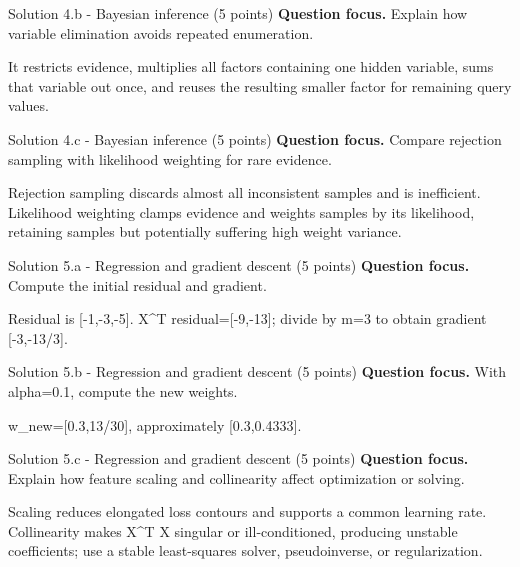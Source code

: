 \documentclass[aspectratio=169,11pt]{beamer}
\begin{document}
\begin{frame}{Solution 4.b - Bayesian inference (5 points)}
\small
\textbf{Question focus.} Explain how variable elimination avoids repeated enumeration.

\vspace{0.25cm}
\answerlabel It restricts evidence, multiplies all factors containing one hidden variable, sums that variable out once, and reuses the resulting smaller factor for remaining query values.
\end{frame}

\begin{frame}{Solution 4.c - Bayesian inference (5 points)}
\small
\textbf{Question focus.} Compare rejection sampling with likelihood weighting for rare evidence.

\vspace{0.25cm}
\answerlabel Rejection sampling discards almost all inconsistent samples and is inefficient. Likelihood weighting clamps evidence and weights samples by its likelihood, retaining samples but potentially suffering high weight variance.
\end{frame}

\begin{frame}{Solution 5.a - Regression and gradient descent (5 points)}
\small
\textbf{Question focus.} Compute the initial residual and gradient.

\vspace{0.25cm}
\answerlabel Residual is [-1,-3,-5]. X\textasciicircum{}T residual=[-9,-13]; divide by m=3 to obtain gradient [-3,-13/3].
\end{frame}

\begin{frame}{Solution 5.b - Regression and gradient descent (5 points)}
\small
\textbf{Question focus.} With alpha=0.1, compute the new weights.

\vspace{0.25cm}
\answerlabel w\_new=[0.3,13/30], approximately [0.3,0.4333].
\end{frame}

\begin{frame}{Solution 5.c - Regression and gradient descent (5 points)}
\small
\textbf{Question focus.} Explain how feature scaling and collinearity affect optimization or solving.

\vspace{0.25cm}
\answerlabel Scaling reduces elongated loss contours and supports a common learning rate. Collinearity makes X\textasciicircum{}T X singular or ill-conditioned, producing unstable coefficients; use a stable least-squares solver, pseudoinverse, or regularization.
\end{frame}
\end{document}

